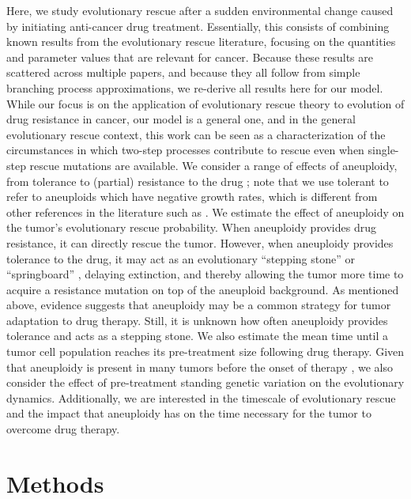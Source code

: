 \documentclass[12pt]{extarticle}
\begin{document}
Here, we study evolutionary rescue after a sudden environmental change caused by initiating anti-cancer drug treatment. 
Essentially, this consists of combining known results from the evolutionary rescue literature, focusing on the quantities and parameter values that are relevant for cancer.
Because these results are scattered across multiple papers, and because they all follow from simple branching process approximations, we re-derive all results here for our model.
While our focus is on the application of evolutionary rescue theory to evolution of drug resistance in cancer, our model is a general one, and in the general evolutionary rescue context, this work can be seen as a characterization of the circumstances in which two-step processes contribute to rescue even when single-step rescue mutations are available.
We consider a range of effects of aneuploidy, from tolerance to (partial) resistance to the drug \citep{brauner2016distinguishing}; note that we use tolerant to refer to aneuploids which have negative growth rates, which is different from other references in the literature such as \citet{berman2020drug}. %
We estimate the effect of aneuploidy on the tumor's evolutionary rescue probability. When aneuploidy provides drug resistance, it can directly rescue the tumor. However, when aneuploidy provides tolerance to the drug, it may act as an evolutionary ``stepping stone'' or ``springboard'' \citep{Yona2015,martin2013probability,osmond_genetic_2020}, delaying extinction, and thereby allowing the tumor more time to acquire a resistance mutation on top of the aneuploid background. 
As mentioned above, evidence suggests that aneuploidy may be a common strategy for tumor adaptation to drug therapy. Still, it is unknown how often aneuploidy provides tolerance and acts as a stepping stone.
We also estimate the mean time until a tumor cell population reaches its pre-treatment size following drug therapy. 
Given that aneuploidy is present in many tumors before the onset of therapy \citep{lukow2021chromosomal,ben2020context}, we also consider the effect of pre-treatment standing genetic variation on the evolutionary dynamics. Additionally, we are interested in the timescale of evolutionary rescue and the impact that aneuploidy has on the time necessary for the tumor to overcome drug therapy. 

\section*{Methods}
\end{document}
